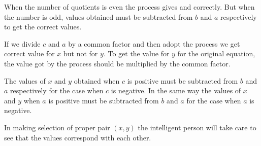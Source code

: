 \documentclass[]{article}
\begin{document}
{\begin{quote}  {
}  \end{quote}
\vspace{-4mm}

{When the number of quotients is even the process gives {} and {}
correctly. But when the number is odd, values obtained must be
subtracted from $b$ and $a$ respectively to get the correct values.}

\newpage
\large

\begin{quote}  {
}  \end{quote}

{If we divide $c$ and $a$ by a common factor and then adopt the {}
process we get correct value for $x$ but not for $ y $. To get the value for
$y$ for the original equation, the value got by the process should be
multiplied by the common factor.}

\begin{quote}  {
}  \end{quote}

{The values of $x$ and $y$ obtained when $c$ is positive must be subtracted
from $b$ and $a$ respectively for the case when $c$ is negative. In the same
way the values of $x$ and $y$ when $a$ is positive must be subtracted from $b$
and $a$ for the case when $a$ is negative. }

\begin{quote}  {
}  \end{quote}

{In making selection of proper pair $(x, y)$ the intelligent person
will take care to see that the values correspond with each other.}

\begin{quote}  {
}  \end{quote}

}
\end{document}
